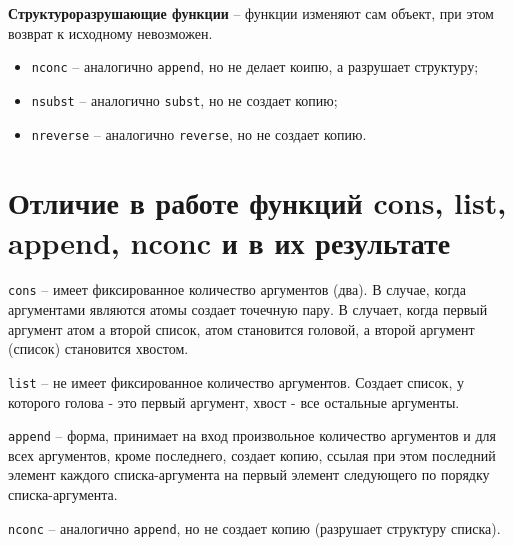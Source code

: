 \textbf{Структуроразрушающие функции} -- функции изменяют сам объект, при этом возврат к исходному невозможен.


\begin{itemize}
    \item \texttt{nconc} -- аналогично \texttt{append}, но не делает коипю, а разрушает структуру;
    \item \texttt{nsubst} -- аналогично \texttt{subst}, но не создает копию;
    \item \texttt{nreverse} -- аналогично \texttt{reverse}, но не создает копию.
\end{itemize}


\section{Отличие в работе функций cons, list, append, nconc и в их результате}

\texttt{cons} -- имеет фиксированное количество аргументов (два). 
В случае, когда аргументами являются атомы создает точечную пару. В случает, когда первый аргумент атом а второй список, атом становится головой, а второй аргумент (список) становится хвостом. 

\texttt{list} -- не имеет фиксированное количество аргументов. 
Создает список, у которого голова - это первый аргумент, хвост - все остальные аргументы.

\texttt{append} -- форма, принимает на вход произвольное количество аргументов и для всех аргументов, кроме последнего, создает копию, ссылая при этом последний элемент каждого списка-аргумента на первый элемент следующего по порядку списка-аргумента.

\texttt{nconc} -- аналогично \texttt{append}, но не создает копию (разрушает структуру списка).

